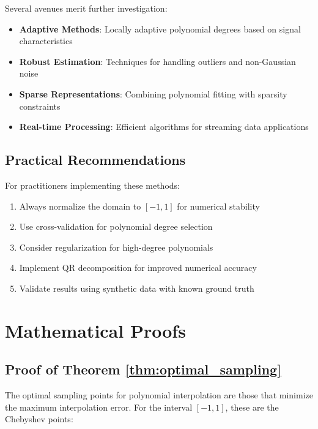 \documentclass[12pt]{article}
\begin{document}
Several avenues merit further investigation:

\begin{itemize}
    \item \textbf{Adaptive Methods}: Locally adaptive polynomial degrees based on signal characteristics
    \item \textbf{Robust Estimation}: Techniques for handling outliers and non-Gaussian noise
    \item \textbf{Sparse Representations}: Combining polynomial fitting with sparsity constraints
    \item \textbf{Real-time Processing}: Efficient algorithms for streaming data applications
\end{itemize}

\subsection{Practical Recommendations}

For practitioners implementing these methods:

\begin{enumerate}
    \item Always normalize the domain to $[-1, 1]$ for numerical stability
    \item Use cross-validation for polynomial degree selection
    \item Consider regularization for high-degree polynomials
    \item Implement QR decomposition for improved numerical accuracy
    \item Validate results using synthetic data with known ground truth
\end{enumerate}

\appendix

\section{Mathematical Proofs}

\subsection{Proof of Theorem \ref{thm:optimal_sampling}}

The optimal sampling points for polynomial interpolation are those that minimize the maximum interpolation error. For the interval $[-1, 1]$, these are the Chebyshev points:
\end{document}
